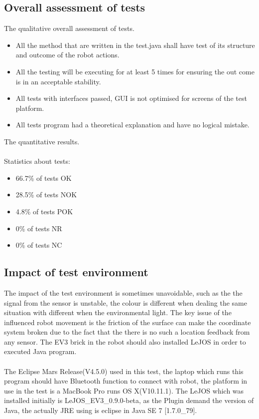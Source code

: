 \documentclass[11pt, a4paper]{article}
\begin{document}
\subsection{Overall assessment of tests}
The qualitative overall assessment of tests.\\
\begin{itemize}
\item {All the method that are written in the test.java shall have test of its structure and outcome of the robot actions.}\\
\item {All the testing will be executing for at least 5 times for ensuring the out come is in an acceptable stability.}\\
\item {All tests with interfaces passed, GUI is not optimised for screens of the test platform.}\\
\item {All tests program had a theoretical explanation and have no logical mistake.}\\
\end{itemize}
The quantitative results.\\
\\
Statistics about tests:\\
\begin{itemize}
\item {66.7\% of tests OK}\\
\item {28.5\% of tests NOK}\\
\item {4.8\% of tests POK}\\
\item {0\% of tests NR}\\
\item {0\% of tests NC}\\
\end{itemize}

\subsection{Impact of test environment}
The impact of the test environment is sometimes unavoidable, such as the the signal from the sensor is unstable, the colour is different when dealing the same situation with different when the environmental light. The key issue of the influenced robot movement is the friction of the surface can make the coordinate system broken due to the fact that the there is no such a location feedback from any sensor. The EV3 brick in the robot should also installed LeJOS in order to executed Java program.\\
\\
The Eclipse Mars Release(V4.5.0) used in this test, the laptop which runs this program should have Bluetooth function to connect with robot, the platform in use in the test is a MacBook Pro runs OS X(V10.11.1). The LeJOS which was installed initially is LeJOS\_EV3\_0.9.0-beta, as the Plugin demand the version of Java, the actually JRE using is eclipse in Java SE 7 [1.7.0\_79].\\
\end{document}
